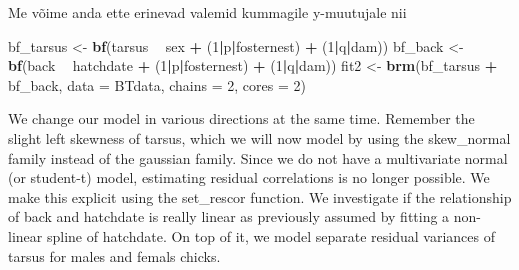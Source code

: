 \documentclass[]{book}
\newenvironment{Shaded}{\begin{snugshade}}{\end{snugshade}}
\newcommand{\DataTypeTok}[1]{\textcolor[rgb]{0.13,0.29,0.53}{#1}}
\newcommand{\DecValTok}[1]{\textcolor[rgb]{0.00,0.00,0.81}{#1}}
\newcommand{\KeywordTok}[1]{\textcolor[rgb]{0.13,0.29,0.53}{\textbf{#1}}}
\newcommand{\NormalTok}[1]{#1}
\newcommand{\OperatorTok}[1]{\textcolor[rgb]{0.81,0.36,0.00}{\textbf{#1}}}
\newcommand{\StringTok}[1]{\textcolor[rgb]{0.31,0.60,0.02}{#1}}
\begin{document}
Me võime anda ette erinevad valemid kummagile y-muutujale nii

\begin{Shaded}
\begin{Highlighting}[]
\NormalTok{bf_tarsus <-}\StringTok{ }\KeywordTok{bf}\NormalTok{(tarsus }\OperatorTok{~}\StringTok{ }\NormalTok{sex }\OperatorTok{+}\StringTok{ }\NormalTok{(}\DecValTok{1}\OperatorTok{|}\NormalTok{p}\OperatorTok{|}\NormalTok{fosternest) }\OperatorTok{+}\StringTok{ }\NormalTok{(}\DecValTok{1}\OperatorTok{|}\NormalTok{q}\OperatorTok{|}\NormalTok{dam))}
\NormalTok{bf_back <-}\StringTok{ }\KeywordTok{bf}\NormalTok{(back }\OperatorTok{~}\StringTok{ }\NormalTok{hatchdate }\OperatorTok{+}\StringTok{ }\NormalTok{(}\DecValTok{1}\OperatorTok{|}\NormalTok{p}\OperatorTok{|}\NormalTok{fosternest) }\OperatorTok{+}\StringTok{ }\NormalTok{(}\DecValTok{1}\OperatorTok{|}\NormalTok{q}\OperatorTok{|}\NormalTok{dam))}
\NormalTok{fit2 <-}\StringTok{ }\KeywordTok{brm}\NormalTok{(bf_tarsus }\OperatorTok{+}\StringTok{ }\NormalTok{bf_back, }\DataTypeTok{data =}\NormalTok{ BTdata, }\DataTypeTok{chains =} \DecValTok{2}\NormalTok{, }\DataTypeTok{cores =} \DecValTok{2}\NormalTok{)}
\end{Highlighting}
\end{Shaded}

We change our model in various directions at the same time. Remember the slight left skewness of tarsus, which we will now model by using the skew\_normal family instead of the gaussian family. Since we do not have a multivariate normal (or student-t) model, estimating residual correlations is no longer possible. We make this explicit using the set\_rescor function. We investigate if the relationship of back and hatchdate is really linear as previously assumed by fitting a non-linear spline of hatchdate. On top of it, we model separate residual variances of tarsus for males and femals chicks.
\end{document}

